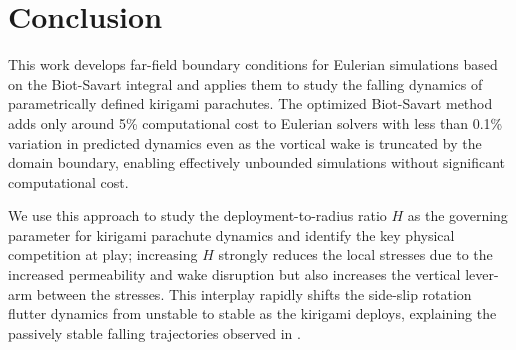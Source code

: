\documentclass[lineno]{JFM-FLM_Au}
\begin{document}

\section{Conclusion}\label{sec:conclusion}

This work develops far-field boundary conditions for Eulerian simulations based on the Biot-Savart integral and applies them to study the falling dynamics of parametrically defined kirigami parachutes. The optimized Biot-Savart method adds only around 5\% computational cost to Eulerian solvers with less than 0.1\% variation in predicted dynamics even as the vortical wake is truncated by the domain boundary, enabling effectively unbounded simulations without significant computational cost.

We use this approach to study the deployment-to-radius ratio $H$ as the governing parameter for kirigami parachute dynamics and identify the key physical competition at play; increasing $H$ strongly reduces the local stresses due to the increased permeability and wake disruption but also increases the vertical lever-arm between the stresses. This interplay rapidly shifts the side-slip rotation flutter dynamics from unstable to stable as the kirigami deploys, explaining the passively stable falling trajectories observed in \cite{Lamoureux2025Kirigami-inspiredReconfiguration}. 
\end{document}
